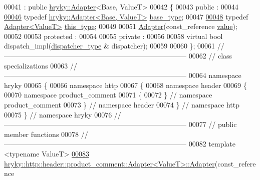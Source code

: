\begin{DoxyCode}
00041     : \textcolor{keyword}{public} \hyperlink{classhryky_1_1_adapter}{hryky::Adapter}<Base, ValueT>
00042 \{
00043 \textcolor{keyword}{public} :
00044 
\hypertarget{http__header__product__comment__adapter_8h_source_l00046}{}\hyperlink{classhryky_1_1http_1_1header_1_1product__comment_1_1_adapter_aec5586dda12b88f06e77342577e5c580}{00046}     \textcolor{keyword}{typedef} \hyperlink{classhryky_1_1_adapter}{hryky::Adapter<Base, ValueT>} \hyperlink{classhryky_1_1http_1_1header_1_1product__comment_1_1_adapter_aec5586dda12b88f06e77342577e5c580}{base_type};
00047 
\hypertarget{http__header__product__comment__adapter_8h_source_l00048}{}\hyperlink{classhryky_1_1http_1_1header_1_1product__comment_1_1_adapter_a818c0abc62d0753ad7e17ce1a8a633a2}{00048}     \textcolor{keyword}{typedef} \hyperlink{classhryky_1_1http_1_1header_1_1product__comment_1_1_adapter}{Adapter<ValueT>} \hyperlink{classhryky_1_1http_1_1header_1_1product__comment_1_1_adapter_a818c0abc62d0753ad7e17ce1a8a633a2}{this_type};
00049 
00051     \hyperlink{classhryky_1_1_adapter_aad569390e8fc9963c8849cbd0c59bea9}{Adapter}(const\_reference \hyperlink{classhryky_1_1_adapter_ab736ecd30f215ca3cbd2364f818cb83f}{value});
00052 
00053 \textcolor{keyword}{protected} :
00054 
00055 \textcolor{keyword}{private} :
00056 
00058     \textcolor{keyword}{virtual} \textcolor{keywordtype}{bool} dispatch\_impl(\hyperlink{classhryky_1_1http_1_1header_1_1product__comment_1_1dispatcher_1_1_base}{dispatcher_type} & dispatcher);
00059     
00060 \};
00061 \textcolor{comment}{//
      ------------------------------------------------------------------------------}
00062 \textcolor{comment}{// class specializations}
00063 \textcolor{comment}{//
      ------------------------------------------------------------------------------}
00064 \textcolor{keyword}{namespace }hryky
00065 \{
00066 \textcolor{keyword}{namespace }http
00067 \{
00068 \textcolor{keyword}{namespace }header
00069 \{
00070 \textcolor{keyword}{namespace }product\_comment
00071 \{
00072 \} \textcolor{comment}{// namespace product\_comment}
00073 \} \textcolor{comment}{// namespace header}
00074 \} \textcolor{comment}{// namespace http}
00075 \} \textcolor{comment}{// namespace hryky}
00076 \textcolor{comment}{//
      ------------------------------------------------------------------------------}
00077 \textcolor{comment}{// public member functions}
00078 \textcolor{comment}{//
      ------------------------------------------------------------------------------}
00082 \textcolor{comment}{}\textcolor{keyword}{template} <\textcolor{keyword}{typename} ValueT>
\hypertarget{http__header__product__comment__adapter_8h_source_l00083}{}\hyperlink{classhryky_1_1http_1_1header_1_1product__comment_1_1_adapter_aa461a60e3fc7d367fa3dbe796174957c}{00083} \hyperlink{classhryky_1_1_adapter_aad569390e8fc9963c8849cbd0c59bea9}{hryky::http::header::product_comment::Adapter<ValueT>::Adapter}(const\_reference 

\end{DoxyCode}
